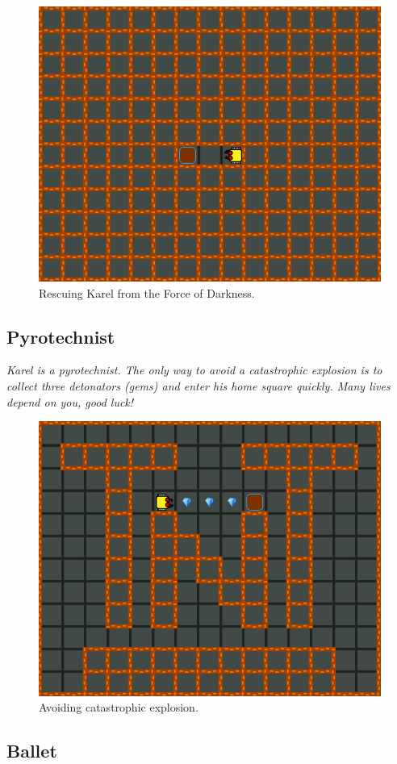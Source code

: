 \begin{figure}[!ht]
\begin{center}
\includegraphics[height=0.4\textwidth]{img/b01.png}
\end{center}
\vspace{-4mm}
\caption{Rescuing Karel from the Force of Darkness.}
\label{fig:b01}
\vspace{-9mm}
\end{figure}
\noindent

\subsection{Pyrotechnist}

{\em Karel is a pyrotechnist. The only way to avoid a catastrophic explosion is to collect three detonators (gems) and enter his home square quickly. Many lives depend on you, good luck!}\\[-8mm]

\begin{figure}[!ht]
\begin{center}
\includegraphics[height=0.4\textwidth]{img/b02.png}
\end{center}
\vspace{-4mm}
\caption{Avoiding catastrophic explosion.}
\label{fig:b02}
\vspace{-1.2cm}
\end{figure}
\newpage


\subsection{Ballet}

